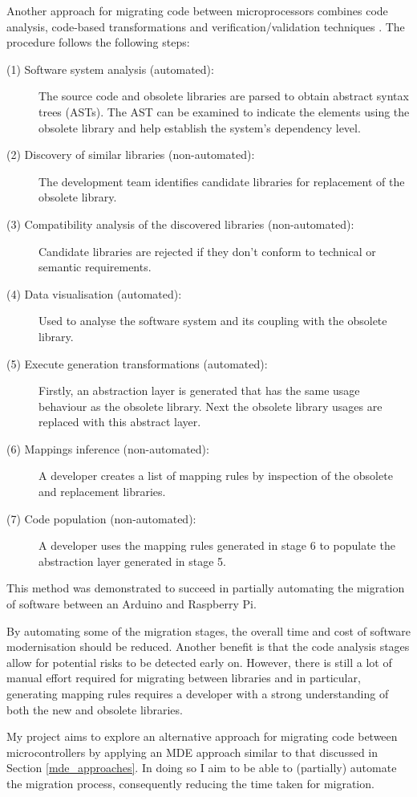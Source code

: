 \documentclass{UoYCSproject}
\begin{document}
Another approach for migrating code between microprocessors combines code analysis, code-based transformations and verification/validation techniques \parencite{gerasimou2017technical}. The procedure follows the following steps:
\begin{description}
\item[(1) Software system analysis (automated):] The source code and obsolete libraries are parsed to obtain abstract syntax trees (ASTs). The AST can be examined to indicate the elements using the obsolete library and help establish the system's dependency level.
\item[(2) Discovery of similar libraries (non-automated):] The development team identifies candidate libraries for replacement of the obsolete library.
\item[(3) Compatibility analysis of the discovered libraries (non-automated):] Candidate libraries are rejected if they don't conform to technical or semantic requirements.
\item[(4) Data visualisation (automated):] Used to analyse the software system and its coupling with the obsolete library.
\item[(5) Execute generation transformations (automated):] Firstly, an abstraction layer is generated that has the same usage behaviour as the obsolete library. Next the obsolete library usages are replaced with this abstract layer.
\item[(6) Mappings inference (non-automated):] A developer creates a list of mapping rules by inspection of the obsolete and replacement libraries.
\item[(7) Code population (non-automated):] A developer uses the mapping rules generated in stage 6 to populate the abstraction layer generated in stage 5.
\end{description}
This method was demonstrated to succeed in partially automating the migration of software between an Arduino and Raspberry Pi.

By automating some of the migration stages, the overall time and cost of software modernisation should be reduced. Another benefit is that the code analysis stages allow for potential risks to be detected early on. However, there is still a lot of manual effort required for migrating between libraries and in particular, generating mapping rules requires a developer with a strong understanding of both the new and obsolete libraries.

My project aims to explore an alternative approach for migrating code between microcontrollers by applying an MDE approach similar to that discussed in Section \ref{mde_approaches}. In doing so I aim to be able to (partially) automate the migration process, consequently reducing the time taken for migration.
\end{document}
